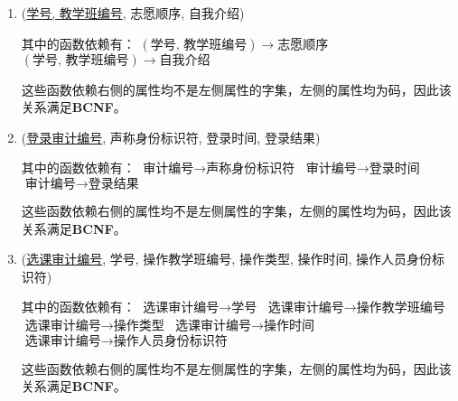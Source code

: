 \begin{enumerate}
    \item (\uline{学号, 教学班编号}, 志愿顺序, 自我介绍) \par
    其中的函数依赖有： \newline
    $(\text{学号, 教学班编号}) \rightarrow \text{志愿顺序}$ \newline
    $(\text{学号, 教学班编号}) \rightarrow \text{自我介绍}$ \par
    这些函数依赖右侧的属性均不是左侧属性的字集，左侧的属性均为码，因此该关系满足\textbf{BCNF}。
    
    \item (\uline{登录审计编号}, 声称身份标识符, 登录时间, 登录结果) \par
    其中的函数依赖有： \newline
    $\text{审计编号} \rightarrow \text{声称身份标识符}$ \newline
    $\text{审计编号} \rightarrow \text{登录时间}$ \newline
    $\text{审计编号} \rightarrow \text{登录结果}$ \par
    这些函数依赖右侧的属性均不是左侧属性的字集，左侧的属性均为码，因此该关系满足\textbf{BCNF}。
    
    \item (\uline{选课审计编号}, 学号, 操作教学班编号, 操作类型, 操作时间, 操作人员身份标识符) \par
    其中的函数依赖有： \newline
    $\text{选课审计编号} \rightarrow \text{学号}$ \newline
    $\text{选课审计编号} \rightarrow \text{操作教学班编号}$ \newline
    $\text{选课审计编号} \rightarrow \text{操作类型}$ \newline
    $\text{选课审计编号} \rightarrow \text{操作时间}$ \newline
    $\text{选课审计编号} \rightarrow \text{操作人员身份标识符}$ \par
    这些函数依赖右侧的属性均不是左侧属性的字集，左侧的属性均为码，因此该关系满足\textbf{BCNF}。
    
\end{enumerate}

